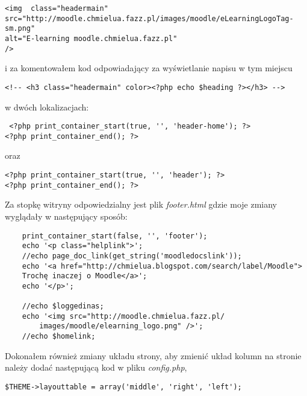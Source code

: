 \begin{verbatim}
<img  class="headermain" 
src="http://moodle.chmielua.fazz.pl/images/moodle/eLearningLogoTag-sm.png" 
alt="E-learning moodle.chmielua.fazz.pl" 
/>
\end{verbatim}
i za komentowałem kod odpowiadający za wyświetlanie napisu w tym miejscu 
\begin{verbatim}
<!-- <h3 class="headermain" color><?php echo $heading ?></h3> -->
\end{verbatim}
w dwóch lokalizacjach:
 \begin{verbatim} <?php print_container_start(true, '', 'header-home'); ?>
<?php print_container_end(); ?>\end{verbatim}
oraz
\begin{verbatim}<?php print_container_start(true, '', 'header'); ?>
<?php print_container_end(); ?>\end{verbatim}
Za stopkę witryny odpowiedzialny jest plik \textit{footer.html} gdzie moje zmiany wyglądały w następujący sposób:
\begin{verbatim}
    print_container_start(false, '', 'footer');
    echo '<p class="helplink">';
    //echo page_doc_link(get_string('moodledocslink'));
    echo '<a href="http://chmielua.blogspot.com/search/label/Moodle">
	Trochę inaczej o Moodle</a>';
    echo '</p>';
   
    //echo $loggedinas;
    echo '<img src="http://moodle.chmielua.fazz.pl/
		images/moodle/elearning_logo.png" />';
    //echo $homelink;\end{verbatim}
Dokonałem również zmiany układu strony, aby zmienić układ kolumn na stronie należy dodać następującą kod w pliku \textit{config.php}, 
\begin{verbatim}
$THEME->layouttable = array('middle', 'right', 'left');
\end{verbatim}
